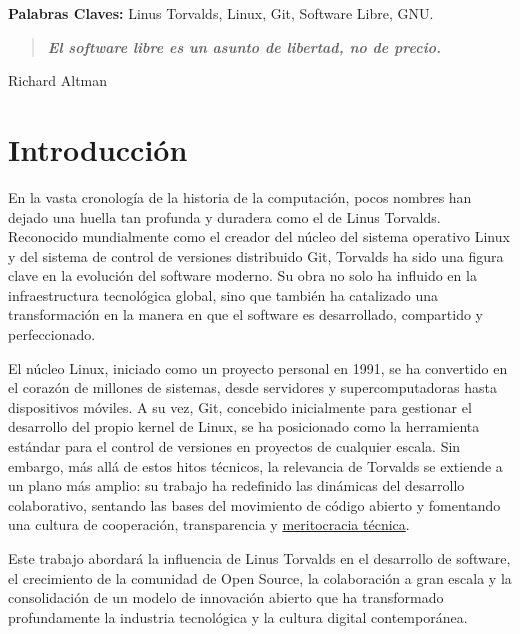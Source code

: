 \documentclass[a4paper,12pt]{article}
\begin{document}
\vspace{1cm}
\textbf{Palabras Claves:} Linus Torvalds, Linux, Git, Software Libre, GNU.  
\newpage

\tableofcontents

\newpage
\hypersetup{linkcolor=blue, urlcolor=blue, citecolor=blue}


\begin{quote}
    \textbf{\textit{El software libre es un asunto de libertad, no de precio.}} 
\end{quote}
\begin{flushright}
Richard Altman
\end{flushright}


\section{Introducción}

En la vasta cronología de la historia de la computación, pocos nombres han
dejado una huella tan profunda y duradera como el de Linus Torvalds. Reconocido
mundialmente como el creador del núcleo del sistema operativo Linux y del
sistema de control de versiones distribuido Git, Torvalds ha sido una figura
clave en la evolución del software moderno. Su obra no solo ha influido en la
infraestructura tecnológica global, sino que también ha catalizado una
transformación en la manera en que el software es desarrollado, compartido y
perfeccionado.

El núcleo Linux, iniciado como un proyecto personal en 1991, se ha convertido en
el corazón de millones de sistemas, desde servidores y supercomputadoras hasta
dispositivos móviles. A su vez, Git, concebido inicialmente para gestionar el
desarrollo del propio kernel de Linux, se ha posicionado como la herramienta
estándar para el control de versiones en proyectos de cualquier escala. Sin
embargo, más allá de estos hitos técnicos, la relevancia de Torvalds se extiende
a un plano más amplio: su trabajo ha redefinido las dinámicas del desarrollo
colaborativo, sentando las bases del movimiento de código abierto y fomentando
una cultura de cooperación, transparencia y \hyperlink{meritocracia}{meritocracia técnica}.

Este trabajo abordará la influencia de Linus Torvalds en el desarrollo de
software, el crecimiento de la comunidad de Open Source, la colaboración a gran
escala y la consolidación de un modelo de innovación abierto que ha transformado
profundamente la industria tecnológica y la cultura digital contemporánea.  
\newpage
\end{document}
